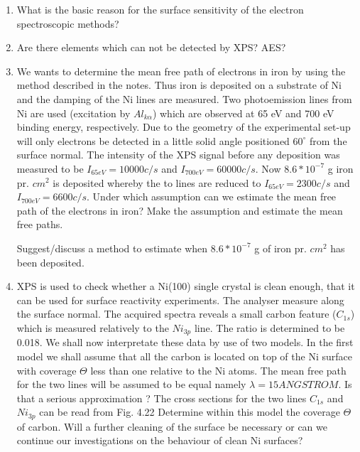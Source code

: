 \begin{enumerate}

             \item What is the basic reason for the surface sensitivity
          of the electron spectroscopic methods?

             \item Are there elements which can not be detected by
          XPS? AES?



             \item We wants to determine the mean free path of
          electrons in iron by using the method described in the
          notes. Thus iron is deposited on a substrate of Ni and the damping
          of the Ni lines are measured. Two photoemission lines
          from Ni are used (excitation by $Al_{k\alpha}$) which are
          observed at 65 eV and 700 eV binding energy, respectively.
          Due to the geometry of the experimental set-up will only
          electrons be detected in a little solid angle positioned
          $60^{\circ}$ from the surface normal. The intensity
          of the XPS signal before any deposition was measured
          to be $I_{65 eV} = 10000 c/s$ and $I_{700 eV} = 60000
          c/s$. Now $ 8.6*10^{-7}$ g iron pr. $cm^{2}$ is deposited
          whereby the to lines are reduced to $I_{65 eV} = 2300 c/s$
          and $I_{700 eV} = 6600 c/s$. Under which assumption can we
          estimate the mean free path of the electrons in iron?
          Make the assumption and estimate the mean free paths.

             Suggest/discuss a method to estimate when $ 8.6*10^{-7}$ g of
          iron pr. $cm^{2}$ has been deposited.



             \item XPS is used to check whether a Ni(100) single
          crystal is clean enough, that it can be used for surface
          reactivity experiments. The analyser measure along the
          surface normal. The acquired spectra reveals a small
          carbon feature ($C_{1s}$) which is measured relatively to
          the $Ni_{3p}$ line. The ratio is determined to be  0.018.
          We shall now interpretate these data by use of two models.
          In the first model we shall assume that all the carbon is
          located on top of the Ni surface with coverage $\Theta$ less
          than one relative to  the Ni atoms. The mean free path for the two lines will be assumed to be equal namely
 $\lambda = 15 ANGSTROM$. Is that a serious approximation ? The cross sections
          for the two lines $C_{1s}$ and $Ni_{3p}$ can be read from
          Fig. 4.22 Determine within this model the coverage $\Theta$
          of carbon. Will a further cleaning of the surface be
          necessary or can we continue our investigations on the
          behaviour of clean Ni surfaces?


\end{enumerate}
